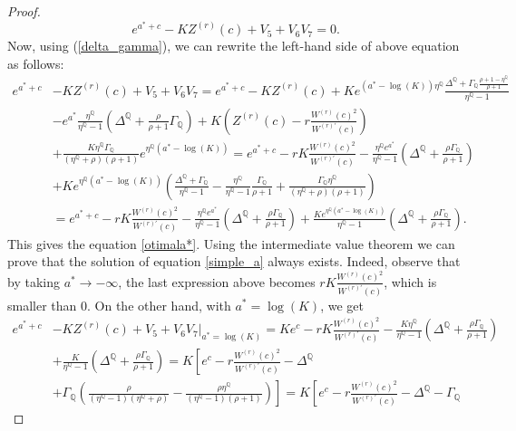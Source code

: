 \documentclass[10pt,a4paper]{amsart}
\def\Q{{\mathbb{Q}}}
\begin{document}
\begin{proof}
			\begin{equation}\label{simple_a}
				e^{a^*+c} - KZ^{(r)}(c) + V_5 + V_6 V_7 = 0.
			\end{equation}
			Now, using (\ref{delta_gamma}), we can rewrite the left-hand side of above equation as follows:
			\begin{align*}
				e^{a^*+c}& - KZ^{(r)}(c) + V_5 + V_6 V_7 = e^{a^*+c} - KZ^{(r)}(c) + Ke^{(a^*-\log(K))\eta^\Q}\frac{\Delta^\Q + \Gamma_\Q \frac{\rho+1-\eta^\Q}{\rho+1}}{\eta^\Q-1} \\
				\nonumber & - e^{a^*} \frac{\eta^\Q}{\eta^\Q-1}\left( \Delta^\Q + \frac{\rho}{\rho+1}\Gamma_\Q \right) + K\left( Z^{(r)}(c) - r\frac{W^{(r)}(c)^2}{W^{(r)'}(c)} \right)  \\
				\nonumber &+ \frac{K\eta^\Q\Gamma_\Q}{\left(\eta^\Q + \rho\right)(\rho+1)}e^{\eta^\Q(a^*-\log(K))} = e^{a^*+c} - rK \frac{W^{(r)}(c)^2}{W^{(r)'}(c)} -  \frac{\eta^\Q e^{a^*}}{\eta^\Q-1}\left( \Delta^\Q + \frac{\rho\Gamma_\Q}{\rho+1} \right)
				\\
				\nonumber & + Ke^{\eta^\Q(a^*-\log(K))}\left( \frac{\Delta^\Q + \Gamma_\Q}{\eta^\Q - 1} - \frac{\eta^\Q}{\eta^\Q-1} \frac{\Gamma_\Q}{\rho + 1} + \frac{\Gamma_\Q\eta^\Q}{(\eta^\Q+\rho)(\rho+1)}\right)
				\\
				\nonumber & = e^{a^*+c} - rK \frac{W^{(r)}(c)^2}{W^{(r)'}(c)} -  \frac{\eta^\Q e^{a^*}}{\eta^\Q-1}\left( \Delta^\Q + \frac{\rho\Gamma_\Q}{\rho+1} \right)  + \frac{Ke^{\eta^\Q(a^*-\log(K))}}{\eta^\Q-1}\left( \Delta^\Q + \frac{\rho\Gamma_\Q}{\rho+1} \right).
			\end{align*}
			This gives the equation \eqref{otimala*}.
			Using the intermediate value theorem we can prove that the solution of equation \eqref{simple_a} always exists. Indeed, observe that by taking $a^* \rightarrow -\infty$, the last expression above
			becomes $rK \frac{W^{(r)}(c)^2}{W^{(r)'}(c)}$, which is smaller than $0$. On the other hand, with $a^* = \log(K)$, we get
			\begin{align*}
				e^{a^*+c}& - KZ^{(r)}(c) + V_5 + V_6 V_7\big|_{a^* = \log(K)} = Ke^c - rK\frac{W^{(r)}(c)^2}{W^{(r)'}(c)} - \frac{K\eta^\Q}{\eta^\Q-1}\left( \Delta^\Q + \frac{\rho\Gamma_\Q}{\rho+1} \right)
				\\
				\nonumber &+ \frac{K}{\eta^\Q-1}\left( \Delta^\Q + \frac{\rho\Gamma_\Q}{\rho+1} \right) = K\left[ e^c - r\frac{W^{(r)}(c)^2}{W^{(r)'}(c)} - \Delta^\Q  \right.
				\\
				\nonumber &+ \left. \Gamma_\Q\left( \frac{\rho}{(\eta^\Q-1)(\eta^\Q+\rho)}  - \frac{\rho \eta^\Q}{(\eta^\Q-1)(\rho+1)} \right) \right] = K\left[ e^c - r\frac{W^{(r)}(c)^2}{W^{(r)'}(c)} - \Delta^\Q - \Gamma_\Q \right.

\end{align*}
\end{proof}
\end{document}
